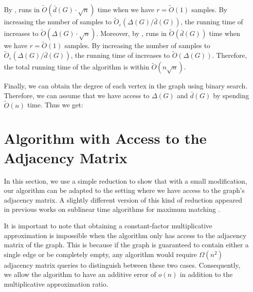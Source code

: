 \documentclass[letterpaper,11pt]{article}
\renewcommand{\epsilon}{\varepsilon}
\newcommand{\wt}[1]{\ensuremath{\widetilde{#1}}}
\begin{document}
By ,  runs in $\wt{O}(\bar{d}(G) \cdot \sqrt{n})$ time when we have $r = \wt{O}(1)$ samples. By increasing the number of samples to $\wt{O}_\epsilon(\Delta(G)/\bar{d}(G))$, the running time of  increases to $\wt{O}(\Delta(G) \cdot \sqrt{n})$. Moreover, by ,  runs in $\wt{O}(\bar{d}(G))$ time when we have $r = \wt{O}(1)$ samples. By increasing the number of samples to $\wt{O}_\epsilon(\Delta(G)/\bar{d}(G))$, the running time of  increases to $\wt{O}(\Delta(G))$. Therefore, the total running time of the algorithm is within $\wt{O}(n \sqrt{n})$.


Finally, we can obtain the degree of each vertex in the graph using binary search. Therefore, we can assume that we have access to $\Delta(G)$ and $\bar{d}(G)$ by spending $\wt{O}(n)$ time.
Thus we get:

\maintheoremAdjlist*





\section{Algorithm with Access to the Adjacency Matrix}\label{sec:matrix}

In this section, we use a simple reduction to show that with a small modification, our algorithm  can be adapted to the setting where we have access to the graph's adjacency matrix. A slightly different version of this kind of reduction appeared in previous works on sublinear time algorithms for maximum matching \cite{Behnezhad21, BehnezhadRRS23}.


It is important to note that obtaining a constant-factor multiplicative approximation is impossible when the algorithm only has access to the adjacency matrix of the graph. This is because if the graph is guaranteed to contain either a single edge or be completely empty, any algorithm would require $\Omega(n^2)$ adjacency matrix queries to distinguish between these two cases. Consequently, we allow the algorithm to have an additive error of $o(n)$ in addition to the multiplicative approximation ratio.
\end{document}
